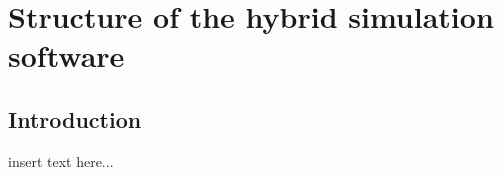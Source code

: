 \graphicspath{{chapt_dutch/}{intro/}{chapt2/}{chapt3/}{chapt4/}{chapt5/}{chapt6/}{chapt7/}{chapt8/}}

\renewcommand\evenpagerightmark{{\scshape\small Appendix C}}
\renewcommand\oddpageleftmark{{\scshape\small Structure of the hybrid simulation software}}

\renewcommand{\bibname}{References}

\hyphenation{}

\chapter[Structure of the hybrid simulation software]%
{Structure of the hybrid simulation software}
\label{app3}

\section{Introduction}
insert text here...

\clearpage{\pagestyle{empty}\cleardoublepage}
